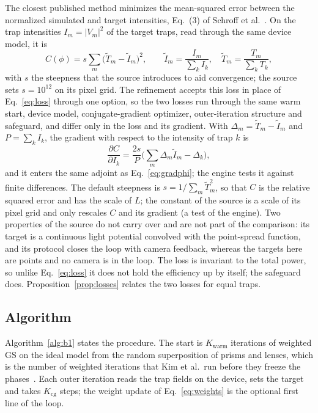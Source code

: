 The closest published method minimizes the mean-squared error between the normalized simulated and target intensities, Eq.~(3) of Schroff et al.~\cite{schroff}. On the trap intensities $I_m=|V_m|^2$ of the target traps, read through the same device model, it is
\begin{equation}
C(\phi)=s\sum_m\big(\tilde T_m-\tilde I_m\big)^2,\qquad \tilde I_m=\frac{I_m}{\sum_kI_k},\quad \tilde T_m=\frac{T_m}{\sum_kT_k},\label{eq:nel}
\end{equation}
with $s$ the steepness that the source introduces to aid convergence; the source sets $s=10^{12}$ on its pixel grid. The refinement accepts this loss in place of Eq.~\ref{eq:loss} through one option, so the two losses run through the same warm start, device model, conjugate-gradient optimizer, outer-iteration structure and safeguard, and differ only in the loss and its gradient. With $\Delta_m=\tilde T_m-\tilde I_m$ and $P=\sum_kI_k$, the gradient with respect to the intensity of trap $k$ is
\begin{equation}
\frac{\partial C}{\partial I_k}=\frac{2s}{P}\Big(\sum_m\Delta_m\tilde I_m-\Delta_k\Big),\label{eq:nelgrad}
\end{equation}
and it enters the same adjoint as Eq.~\ref{eq:gradphi}; the engine tests it against finite differences. The default steepness is $s=1/\sum_m\tilde T_m^2$, so that $C$ is the relative squared error and has the scale of $L$; the constant of the source is a scale of its pixel grid and only rescales $C$ and its gradient (a test of the engine). Two properties of the source do not carry over and are not part of the comparison: its target is a continuous light potential convolved with the point-spread function, and its protocol closes the loop with camera feedback, whereas the targets here are points and no camera is in the loop. The loss is invariant to the total power, so unlike Eq.~\ref{eq:loss} it does not hold the efficiency up by itself; the safeguard does. Proposition~\ref{prop:losses} relates the two losses for equal traps.

\subsection{Algorithm}\label{sec:algorithm}

Algorithm~\ref{alg:b1} states the procedure. The start is $K_{\mathrm{warm}}$ iterations of weighted GS on the ideal model from the random superposition of prisms and lenses, which is the number of weighted iterations that Kim et al.\ run before they freeze the phases~\cite{kim2019}.
Each outer iteration reads the trap fields on the device, sets the target and takes $K_{\mathrm{cg}}$ steps; the weight update of Eq.~\ref{eq:weights} is the optional first line of the loop.

